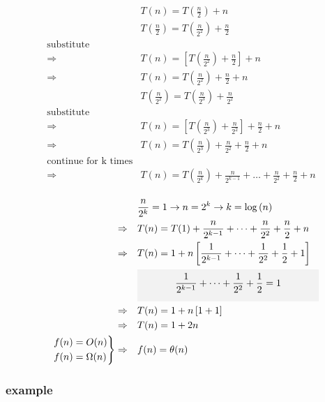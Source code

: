 \documentclass[12pt]{article}
\begin{document}
\begin{align*}
&T(n) = T(\frac{n}{2}) + n \\
&T(\frac{n}{2}) = T(\frac{n}{2^{2}}) + \frac{n}{2} \\
\text{substitute}& \\
\Rightarrow \quad &T(n) = [ T(\frac{n}{2^{2}}) + \frac{n}{2} ] + n \\
\Rightarrow \quad &T(n) = T(\frac{n}{2^{2}}) + \frac{n}{2}  + n \\
&T(\frac{n}{2^{2}}) = T(\frac{n}{2^{3}}) + \frac{n}{2^{2}} \\
\text{substitute} \\
\Rightarrow \quad &T(n) = [ T(\frac{n}{2^{3}}) + \frac{n}{2^{2}} ] + \frac{n}{2} + n \\
\Rightarrow \quad &T(n) =  T(\frac{n}{2^{3}}) + \frac{n}{2^{2}} + \frac{n}{2} + n \\
\text{continue for k times}& \\
\Rightarrow \quad &T(n) =  T(\frac{n}{2^{k}}) + \frac{n}{2^{k-1}} + \dots + \frac{n}{2^{2}} + \frac{n}{2} + n \\
\end{align*}



\begin{align*}
&\frac{n}{2^{k}} = 1 \to n = 2^{k} \to k = \log{(n)}  \\
\Rightarrow \quad &T(n) =  T(1) + \frac{n}{2^{k-1}} + \dots + \frac{n}{2^{2}} + \frac{n}{2} + n \\
\Rightarrow \quad &T(n) = 1 + n \left[ \frac{1}{2^{k-1}} + \dots + \frac{1}{2^{2}} + \frac{1}{2} + 1 \right] \\
& \colorbox{gray!10}{\parbox{180pt}{
    $$ \frac{1}{2^{k-1}} + \dots + \frac{1}{2^{2}} + \frac{1}{2} = 1$$
}}
\\
\Rightarrow \quad &T(n) = 1 + n \left[ 1 + 1 \right] \\
\Rightarrow \quad &T(n) = 1 + 2n \\
\begin{rcases}
&f(n) = O(n) \\
&f(n) = \Omega(n) 
\end{rcases}
\Rightarrow \quad &f(n) = \theta(n) 
\end{align*}











\subsubsection{example}
\end{document}

